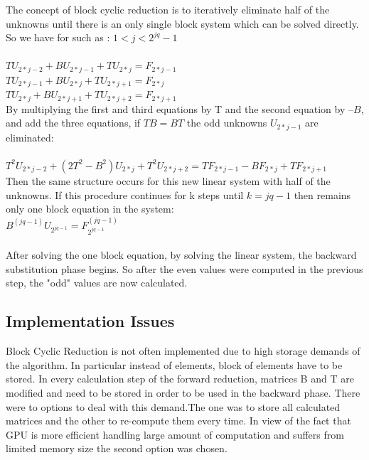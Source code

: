 The concept of block cyclic reduction is to iteratively eliminate half of the unknowns until there is an only single block system which can be solved directly.
So we have for such as : $1 < j < 2^{jq} -1$\\\\
$TU_{2*j-2} + BU_{2*j-1}+ TU_{2*j} = F_{2*j-1}$ \\
\hspace*{1cm} $TU_{2*j-1} + BU_{2*j}+ TU_{2*j+1} = F_{2*j}$ \\
\hspace*{2cm}$TU_{2*j} + BU_{2*j+1}+ TU_{2*j+2} = F_{2*j+1}$\\

By multiplying the first and third equations by T and the second equation by $–B$, and add the three equations, if $TB = BT$  the odd unknowns $U_{2*j-1}$ are eliminated:\\\\
$T^2U_{2*j-2} + (2T^2 - B^2)U_{2*j} + T^2U_{2*j+2} = TF_{2*j-1} -BF_{2*j} + TF_{2*j+1}$
\\

Then the same structure occurs for this new linear system with half of the unknowns. If this procedure continues for k steps until $k = jq-1$ then remains only one block equation in the system:\\
$B^{(jq-1)}U_{2^{jq-1}} = F^{(jq-1)}_{2^{jq-1}}$\\\\

After solving the one block equation, by solving the linear system, the backward substitution phase begins. So after the even values were computed in the previous step, the "odd" values are now calculated.
\subsection{Implementation Issues}
Block Cyclic Reduction is not often implemented due to high storage demands of the algorithm. In particular instead of elements, block of elements have to be stored. In every calculation step of the forward reduction, matrices B and T are modified and need to be stored in order to be used in the backward phase. 
There were to options to deal with this demand.The one was to store all calculated matrices and the other to re-compute them every time. In view of the fact that GPU is more efficient handling large amount of computation and suffers from limited memory size the second option was chosen.\\

